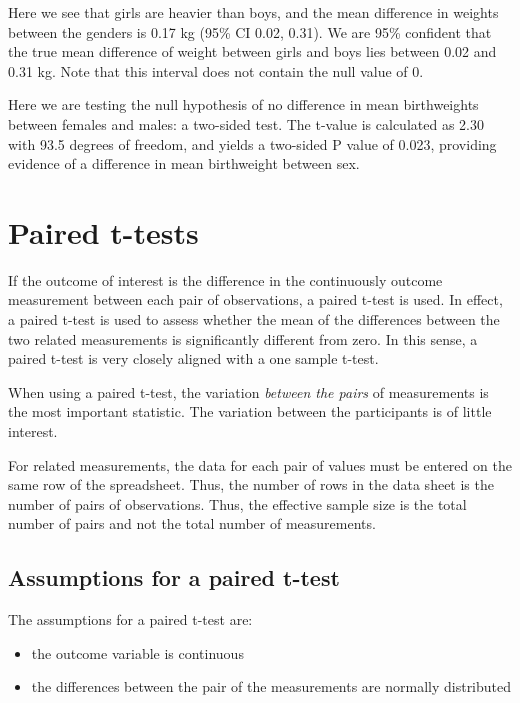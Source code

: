 \documentclass[
  a4paper,
]{memoir}
\providecommand{\tightlist}{%
  \setlength{\itemsep}{0pt}\setlength{\parskip}{0pt}}
\begin{document}
Here we see that girls are heavier than boys, and the mean difference in
weights between the genders is 0.17 kg (95\% CI 0.02, 0.31). We are 95\%
confident that the true mean difference of weight between girls and boys
lies between 0.02 and 0.31 kg. Note that this interval does not contain
the null value of 0.

Here we are testing the null hypothesis of no difference in mean
birthweights between females and males: a two-sided test. The t-value is
calculated as 2.30 with 93.5 degrees of freedom, and yields a two-sided
P value of 0.023, providing evidence of a difference in mean birthweight
between sex.

\section{Paired t-tests}\label{paired-t-tests}

If the outcome of interest is the difference in the continuously outcome
measurement between each pair of observations, a paired t-test is used.
In effect, a paired t-test is used to assess whether the mean of the
differences between the two related measurements is significantly
different from zero. In this sense, a paired t-test is very closely
aligned with a one sample t-test.

When using a paired t-test, the variation \emph{between the pairs} of
measurements is the most important statistic. The variation between the
participants is of little interest.

For related measurements, the data for each pair of values must be
entered on the same row of the spreadsheet. Thus, the number of rows in
the data sheet is the number of pairs of observations. Thus, the
effective sample size is the total number of pairs and not the total
number of measurements.

\subsection{Assumptions for a paired
t-test}\label{assumptions-for-a-paired-t-test}

The assumptions for a paired t-test are:

\begin{itemize}
\tightlist
\item
  the outcome variable is continuous
\item
  the differences between the pair of the measurements are normally
  distributed
\end{itemize}
\end{document}
